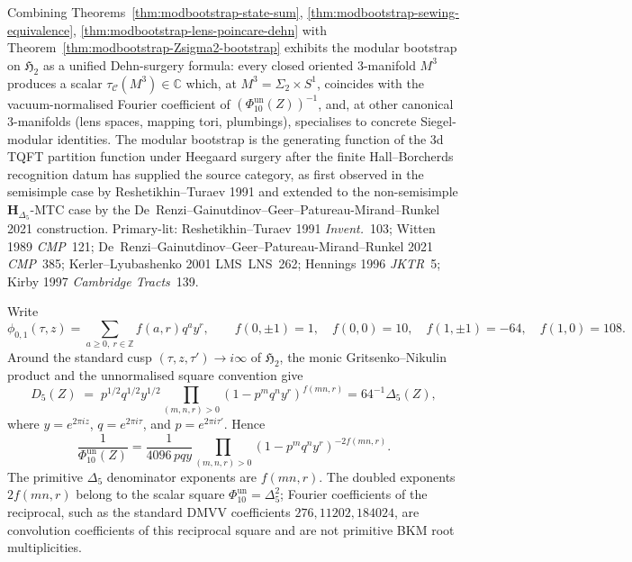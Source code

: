 \begin{remark}
\label{rem:modbootstrap-surgery-and-siegel}
Combining Theorems~\ref{thm:modbootstrap-state-sum},
\ref{thm:modbootstrap-sewing-equivalence},
\ref{thm:modbootstrap-lens-poincare-dehn} with
Theorem~\ref{thm:modbootstrap-Zsigma2-bootstrap} exhibits the
modular bootstrap on $\mathfrak H_2$ as a unified Dehn-surgery
formula: every closed oriented 3-manifold $M^3$ produces a scalar
$\tau_{\mathcal C}(M^3)\in\mathbb C$ which, at $M^3 = \Sigma_2\times
S^1$, coincides with the vacuum-normalised Fourier coefficient of
$(\Phi_{10}^{\mathrm{un}}(Z))^{-1}$, and, at other canonical 3-manifolds (lens spaces,
mapping tori, plumbings), specialises to concrete Siegel-modular
identities. The modular bootstrap is the generating function of the
3d TQFT partition function under Heegaard surgery after the finite
Hall--Borcherds recognition datum has supplied the source category, as
first observed
in the semisimple case by Reshetikhin--Turaev 1991 and extended to the
non-semisimple $\mathbf H_{\Delta_5}$-MTC case by the
De~Renzi--Gainutdinov--Geer--Patureau-Mirand--Runkel 2021 construction.
Primary-lit: Reshetikhin--Turaev 1991 \emph{Invent.}~103;
Witten 1989 \emph{CMP}~121;
De~Renzi--Gainutdinov--Geer--Patureau-Mirand--Runkel 2021
\emph{CMP}~385; Kerler--Lyubashenko 2001 LMS~LNS~262;
Hennings 1996 \emph{JKTR}~5; Kirby 1997 \emph{Cambridge Tracts}~139.
\end{remark}

\begin{theorem}
\label{thm:modbootstrap-genus2-fourier-dictionary}
Write
\[
 \phi_{0,1}(\tau,z)=\sum_{a\geq0,\ r\in\mathbb Z}f(a,r)q^a y^r,
 \qquad
 f(0,\pm1)=1,\quad f(0,0)=10,\quad
 f(1,\pm1)=-64,\quad f(1,0)=108 .
\]
Around the standard cusp
$(\tau,z,\tau')\to i\infty$ of $\mathfrak H_2$, the monic
Gritsenko--Nikulin product and the unnormalised square convention give
\[
 D_5(Z)
 \;=\;
 p^{1/2}q^{1/2}y^{1/2}
 \prod_{(m,n,r)>0}(1-p^m q^n y^r)^{f(mn,r)}
 =64^{-1}\Delta_5(Z),
\]
where $y=e^{2\pi iz}$, $q=e^{2\pi i\tau}$, and
$p=e^{2\pi i\tau'}$.  Hence
\[
 \frac{1}{\Phi_{10}^{\mathrm{un}}(Z)}
 =
 \frac{1}{4096\,p q y}
 \prod_{(m,n,r)>0}(1-p^m q^n y^r)^{-2f(mn,r)} .
\]
The primitive $\Delta_5$ denominator exponents are $f(mn,r)$.  The
doubled exponents $2f(mn,r)$ belong to the scalar square
$\Phi_{10}^{\mathrm{un}}=\Delta_5^2$; Fourier coefficients of the
reciprocal, such as the standard DMVV coefficients
$276,11202,184024$, are convolution coefficients of this reciprocal
square and are not primitive BKM root multiplicities.
\end{theorem}

